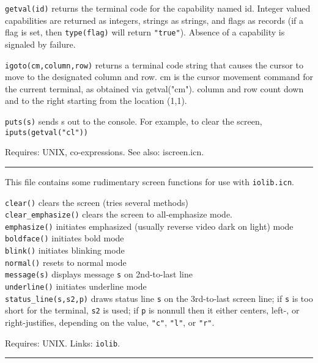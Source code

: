 \texttt{getval(id)} returns the terminal code for the capability named
id. Integer valued capabilities are returned as integers, strings as
strings, and flags as records (if a flag is set, then
\texttt{type(flag)} will return
\texttt{"true"}). Absence of a capability
is signaled by failure.

\texttt{igoto(cm,column,row)} returns a terminal code string that causes
the cursor to move to the designated column and row. cm is the cursor
movement command for the current terminal, as obtained via
getval("cm"). column and row count down and
to the right starting from the location (1,1).

\texttt{puts(s)} sends s out to the console. For example, to clear the
screen, \texttt{iputs(getval("cl"))}

Requires: UNIX, co-expressions. See also: iscreen.icn.

\vspace{0.25cm}\hrule{}

This file contains some rudimentary screen functions for use with
\texttt{iolib.icn}.

\texttt{clear()} clears the screen (tries several methods)\\
\texttt{clear\_emphasize()} clears the screen to all-emphasize
mode.\\
\texttt{emphasize()} initiates emphasized (usually reverse video dark on
light) mode\\
\texttt{boldface()} initiates bold mode\\
\texttt{blink()} initiates blinking mode\\
\texttt{normal()} resets to normal mode\\
\texttt{message(s)} displays message \texttt{s} on 2nd-to-last
line\\
\texttt{underline()} initiates underline mode\\
\texttt{status\_line(s,s2,p)} draws status line \texttt{s} on the
3rd-to-last screen line; if \texttt{s} is too short for the terminal,
\texttt{s2} is used; if \texttt{p} is nonnull then it either centers,
left-, or right-justifies, depending on the value,
\texttt{"c"},
\texttt{"l"}, or
\texttt{"r"}.

Requires: UNIX. Links: \texttt{iolib}.

\vspace{0.25cm}\hrule{}

